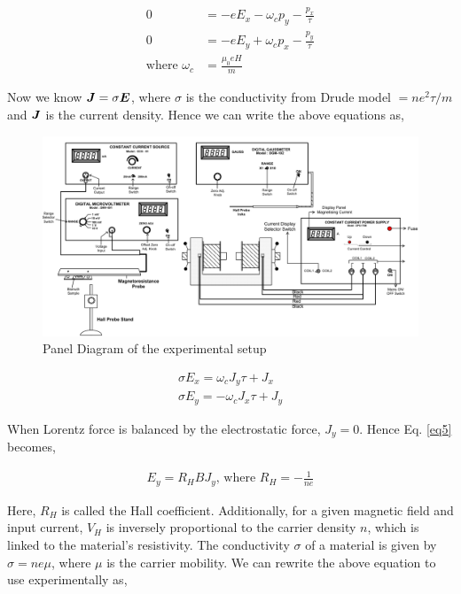 \begin{align}
    0 &= -eE_x - \omega_c p_y-\frac{p_x}{\tau}\\
    0 &= -eE_y + \omega_c p_x-\frac{p_y}{\tau}\\
    \text{where } \omega_c &= \frac{\mu_0eH}{m}\nonumber
\end{align}

Now we know $\boldsymbol{J}=\sigma\boldsymbol{E}$, where $\sigma$ is the conductivity from Drude model $=ne^2\tau/m$ and $\boldsymbol{J}$ is the current density. Hence we can write the above equations as,

\begin{figure}
    \centering
    \includegraphics[width=1.7\columnwidth]{images/panel.png}
    \caption{Panel Diagram of the experimental setup}
    \label{expt}
\end{figure}

\begin{align}
    \sigma E_x = \omega_c J_y\tau+J_x \label{eq4}\\
    \sigma E_y = -\omega_c J_x\tau+J_y \label{eq5}
\end{align}

When Lorentz force is balanced by the electrostatic force, $J_y=0$. Hence Eq. \ref{eq5} becomes,

\begin{align} \label{eq6}
    E_y = R_HBJ_y \text{, where }R_H = -\frac{1}{ne} 
\end{align}

Here, $R_H$ is called the Hall coefficient. Additionally, for a given magnetic field and input current, $V_H$ is inversely proportional to the carrier density $n$, which is linked to the material’s resistivity. The conductivity $\sigma$ of a material is given by $\sigma = ne\mu$, where $\mu$ is the carrier mobility. We can rewrite the above equation to use experimentally as,


